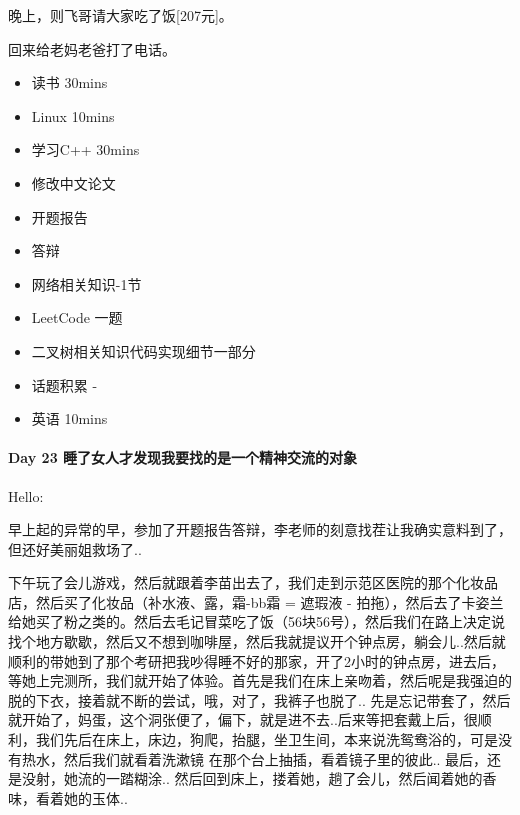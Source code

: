 \documentclass[UTF8,a4paper,8pt]{ctexbook}
\begin{document}
		 晚上，则飞哥请大家吃了饭[207元]。
		 
		 回来给老妈老爸打了电话。
		 
			  \begin{itemize}
			  	\item 读书  30mins	
			  	\item Linux 10mins	  
			  	\item 学习C++ 30mins 
			  	\item 修改中文论文
			  	\item 开题报告
			  	\item \makebox[0pt][l]{$\square$}\raisebox{.15ex}{\hspace{0.1em}$\checkmark$}答辩
			  	
			  	\item  网络相关知识-1节
			  	\item  LeetCode 一题
			  	\item  二叉树相关知识代码实现细节一部分
			  	
			  	\item  \makebox[0pt][l]{$\square$}\raisebox{.15ex}{\hspace{0.1em}$\checkmark$}话题积累 	- 
			  	\item  英语 10mins 	 
			  \end{itemize}
		 
 	 \paragraph{Day 23   睡了女人才发现我要找的是一个精神交流的对象   \quad     }Hello:
 	 
	 	 早上起的异常的早，参加了开题报告答辩，李老师的刻意找茬让我确实意料到了，但还好美丽姐救场了..
	 	 
	 	 下午玩了会儿游戏，然后就跟着李苗出去了，我们走到示范区医院的那个化妆品店，然后买了化妆品（补水液、露，霜-bb霜 = 遮瑕液 - 拍拖），然后去了卡姿兰给她买了粉之类的。然后去毛记冒菜吃了饭（56块56号），然后我们在路上决定说找个地方歇歇，然后又不想到咖啡屋，然后我就提议开个钟点房，躺会儿..然后就顺利的带她到了那个考研把我吵得睡不好的那家，开了2小时的钟点房，进去后，等她上完测所，我们就开始了体验。首先是我们在床上亲吻着，然后呢是我强迫的脱的下衣，接着就不断的尝试，哦，对了，我裤子也脱了.. 先是忘记带套了，然后就开始了，妈蛋，这个洞张便了，偏下，就是进不去..后来等把套戴上后，很顺利，我们先后在床上，床边，狗爬，抬腿，坐卫生间，本来说洗鸳鸯浴的，可是没有热水，然后我们就看着洗漱镜 在那个台上抽插，看着镜子里的彼此.. 最后，还是没射，她流的一踏糊涂.. 然后回到床上，搂着她，趟了会儿，然后闻着她的香味，看着她的玉体..
	 	 
\end{document}
